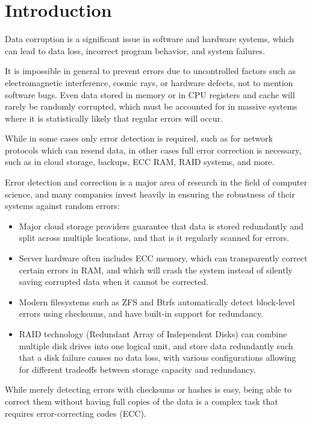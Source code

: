 \chapter{Introduction}

Data corruption is a significant issue in software and hardware systems, which can lead to data loss, incorrect program behavior, and system failures.

It is impossible in general to prevent errors due to uncontrolled factors such as electromagnetic interference, cosmic rays, or hardware defects, not to mention software bugs.
Even data stored in memory or in CPU registers and cache will rarely be randomly corrupted, which must be accounted for in massive systems where it is statistically likely that regular errors will occur.

While in some cases only error detection is required, such as for network protocols which can resend data, in other cases full error correction is necessary, such as in cloud storage, backups, ECC RAM, RAID systems, and more.

Error detection and correction is a major area of research in the field of computer science, and many companies invest heavily in ensuring the robustness of their systems against random errors:

\begin{itemize}
    \item Major cloud storage providers guarantee that data is stored redundantly and split across multiple locations, and that is it regularly scanned for errors.
    \item Server hardware often includes ECC memory, which can transparently correct certain errors in RAM, and which will crash the system instead of silently saving corrupted data when it cannot be corrected.
    \item Modern filesystems such as ZFS and Btrfs automatically detect block-level errors using checksums, and have built-in support for redundancy.
    \item RAID technology (Redundant Array of Independent Disks) can combine multiple disk drives into one logical unit, and store data redundantly such that a disk failure causes no data loss,
          with various configurations allowing for different tradeoffs between storage capacity and redundancy.
\end{itemize}

While merely detecting errors with checksums or hashes is easy, being able to correct them without having full copies of the data is a complex task that requires error-correcting codes (ECC).

